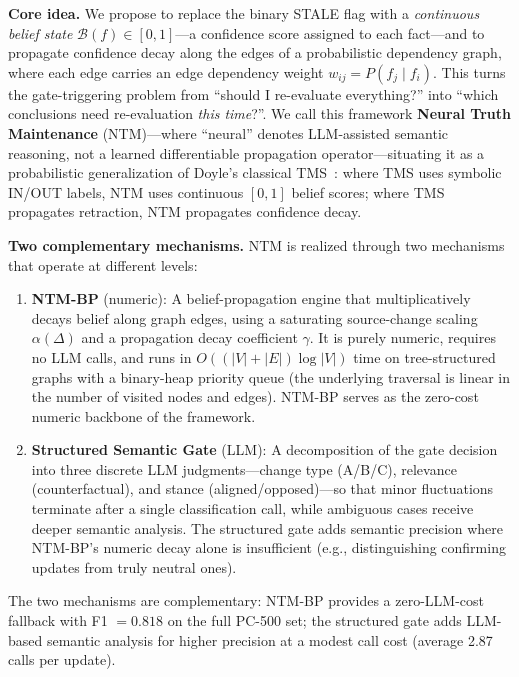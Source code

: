 \documentclass{article}
\theoremstyle{definition}
\begin{document}
\textbf{Core idea.} We propose to replace the binary STALE flag with a
\emph{continuous belief state} $\mathcal{B}(f)\in[0,1]$---a confidence
score assigned to each fact---and to propagate confidence decay along the
edges of a probabilistic dependency graph, where each edge carries an
edge dependency weight $w_{ij}=P(f_j\mid f_i)$. This
turns the gate-triggering problem from ``should I re-evaluate
everything?'' into ``which conclusions need re-evaluation \emph{this
time}?''. We call this framework \textbf{Neural Truth Maintenance}
(NTM)---where ``neural'' denotes LLM-assisted semantic reasoning, not a
learned differentiable propagation operator---situating it as a
probabilistic generalization of Doyle's
classical TMS~\cite{doyle1979tms}: where TMS uses symbolic IN/OUT labels,
NTM uses continuous $[0,1]$ belief scores; where TMS propagates
retraction, NTM propagates confidence decay.

\textbf{Two complementary mechanisms.} NTM is realized through two
mechanisms that operate at different levels:

\begin{enumerate}
\item \textbf{NTM-BP} (numeric): A belief-propagation engine that
  multiplicatively decays belief along graph edges, using a saturating
  source-change scaling $\alpha(\Delta)$ and a propagation decay
  coefficient $\gamma$. It is purely numeric, requires no LLM calls,
  and runs in $O((|V|+|E|)\log|V|)$ time on tree-structured graphs with
  a binary-heap priority queue (the underlying traversal is linear in
  the number of visited nodes and edges). NTM-BP serves
  as the zero-cost numeric backbone of the framework.
\item \textbf{Structured Semantic Gate} (LLM): A decomposition of the
  gate decision into three discrete LLM judgments---change type (A/B/C),
  relevance (counterfactual), and stance (aligned/opposed)---so that minor
  fluctuations terminate after a single classification call, while
  ambiguous cases receive deeper semantic analysis. The structured gate
  adds semantic precision where NTM-BP's numeric decay alone is
  insufficient (e.g., distinguishing confirming updates from truly neutral
  ones).
\end{enumerate}

The two mechanisms are complementary: NTM-BP provides a zero-LLM-cost
fallback with F1 $=0.818$ on the full PC-500 set;
the structured gate adds LLM-based semantic analysis for higher precision
at a modest call cost (average 2.87 calls per update).
\end{document}
